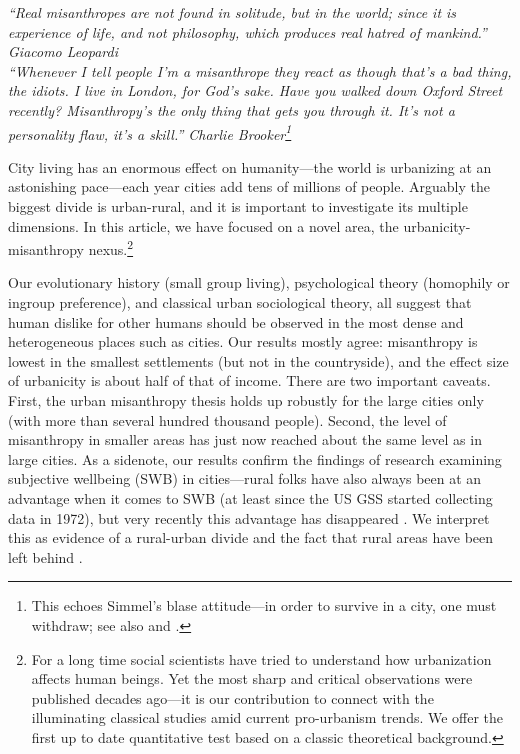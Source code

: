 \documentclass[11pt, letterpaper]{article}
\begin{document}
\begin{spacing}{1.4}
{\small\it \noindent ``Real misanthropes are not found in solitude, but in the world; since
it is experience of life, and not philosophy, which produces real hatred of
mankind.'' Giacomo Leopardi\\

\noindent ``Whenever I tell people I'm a misanthrope they react as though that's a bad thing, the idiots. I live in London, for God's sake. Have you walked down Oxford Street recently? Misanthropy's the only thing that gets you through it. It's not a personality flaw, it's a skill.'' Charlie Brooker\footnote{This echoes Simmel's blase attitude---in order to survive in a city, one must withdraw; see also \citet{milgram70} and \citet{lederbogen11}.}\\}

City living has an enormous effect on humanity---the world is urbanizing at
an astonishing pace---each year cities add tens of millions of people. Arguably the biggest divide is urban-rural, and it is important to investigate its multiple dimensions. In this article, we have focused on a novel area, the urbanicity-misanthropy nexus.\footnote{For a long time social scientists have tried to understand how urbanization affects human beings. Yet the most sharp and critical observations were published decades ago---it is our contribution to connect with the illuminating classical studies amid current pro-urbanism trends. We offer the first up to date quantitative test based on a classic theoretical background.}   
 
Our evolutionary history (small group living),  psychological theory (homophily or ingroup preference), and classical urban sociological theory, all suggest that human dislike for other humans should be observed in the most dense and heterogeneous places such as cities. Our results mostly agree: misanthropy is lowest in the smallest settlements (but not in the countryside), and the effect size of urbanicity is about half of that of income.
%
There are two important caveats. First, the urban misanthropy thesis holds up robustly for the large cities only (with more than several hundred thousand people). Second, the level of misanthropy in smaller areas has just now reached about the same level as in large cities.  
% 
As a sidenote, our results confirm the findings of research examining subjective wellbeing (SWB) in cities---rural folks have also
always been at an advantage when it comes to SWB (at least since the US GSS
started collecting data in 1972), but very recently this advantage has disappeared \citep{aok-swbGenYcity18}. We interpret this as evidence of a rural-urban divide and the fact that rural areas have been left behind \citep[e.g.,][]{fullerNYT17monD, hansonCityJournalautumn15}.


\end{spacing}
\end{document}
